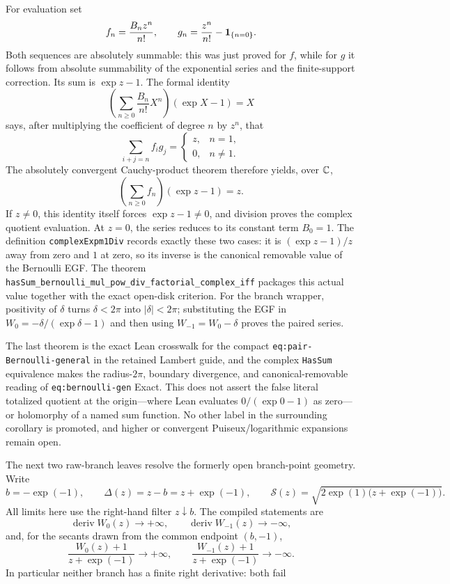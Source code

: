 \documentclass[11pt,oneside]{article}
\theoremstyle{definition}
\theoremstyle{remark}
\begin{document}
For evaluation set
\[
 f_n=\frac{B_nz^n}{n!},\qquad
 g_n=\frac{z^n}{n!}-\mathbf{1}_{\{n=0\}}.
\]
Both sequences are absolutely summable: this was just proved for \(f\), while
for \(g\) it follows from absolute summability of the exponential series and
the finite-support correction.  Its sum is \(\exp z-1\).  The formal identity
\[
 \left(\sum_{n\ge0}\frac{B_n}{n!}X^n\right)(\exp X-1)=X
\]
says, after multiplying the coefficient of degree \(n\) by \(z^n\), that
\[
 \sum_{i+j=n}f_i g_j=
 \begin{cases}z,&n=1,\\0,&n\ne1.\end{cases}
\]
The absolutely convergent Cauchy-product theorem therefore yields, over
\(\mathbb{C}\),
\[
 \left(\sum_{n\ge0}f_n\right)(\exp z-1)=z.
\]
If \(z\ne0\), this identity itself forces \(\exp z-1\ne0\), and division
proves the complex quotient evaluation.  At \(z=0\), the series reduces to
its constant term \(B_0=1\).  The definition
\nolinkurl{complexExpm1Div} records exactly these two cases: it is
\((\exp z-1)/z\) away from zero and \(1\) at zero, so its inverse is the
canonical removable value of the Bernoulli EGF.  The theorem
\nolinkurl{hasSum_bernoulli_mul_pow_div_factorial_complex_iff} packages this
actual value together with the exact open-disk criterion.  For the branch
wrapper, positivity of \(\delta\) turns \(\delta<2\pi\) into
\(\lvert\delta\rvert<2\pi\); substituting the EGF in
\(W_0=-\delta/(\exp\delta-1)\) and then using \(W_{-1}=W_0-\delta\) proves the
paired series.

The last theorem is the exact Lean crosswalk for the compact
\nolinkurl{eq:pair-Bernoulli-general} in the retained Lambert guide, and the
complex \nolinkurl{HasSum} equivalence makes the radius-\(2\pi\), boundary
divergence, and canonical-removable reading of
\nolinkurl{eq:bernoulli-gen} Exact.  This does not assert the false literal
totalized quotient at the origin---where Lean evaluates
\(0/(\exp 0-1)\) as zero---or holomorphy of a named sum function.  No other
label in the surrounding corollary is promoted, and higher or convergent
Puiseux/logarithmic expansions remain open.

The next two raw-branch leaves resolve the formerly open branch-point
geometry.  Write
\[
 b=-\exp(-1),\qquad \Delta(z)=z-b=z+\exp(-1),\qquad
 \mathcal S(z)=\sqrt{2\exp(1)\bigl(z+\exp(-1)\bigr)}.
\]
All limits here use the right-hand filter \(z\downarrow b\).  The compiled
statements are
\[
 \operatorname{deriv}W_0(z)\longrightarrow+\infty,
 \qquad
 \operatorname{deriv}W_{-1}(z)\longrightarrow-\infty,
\]
and, for the secants drawn from the common endpoint \((b,-1)\),
\[
 \frac{W_0(z)+1}{z+\exp(-1)}\longrightarrow+\infty,
 \qquad
 \frac{W_{-1}(z)+1}{z+\exp(-1)}\longrightarrow-\infty.
\]
In particular neither branch has a finite right derivative: both fail
\end{document}
